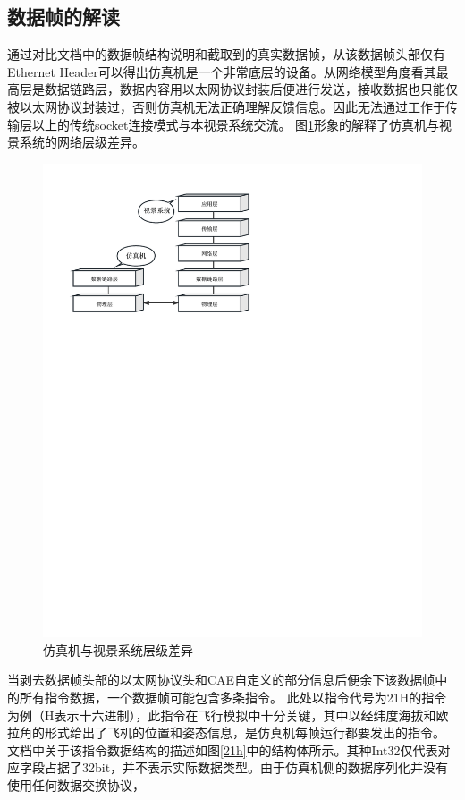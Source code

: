 \subsection{数据帧的解读}
通过对比文档中的数据帧结构说明和截取到的真实数据帧，从该数据帧头部仅有Ethernet Header可以得出仿真机是一个非常底层的设备。从网络模型角度看其最高层是数据链路层，数据内容用以太网协议封装后便进行发送，接收数据也只能仅被以太网协议封装过，否则仿真机无法正确理解反馈信息。因此无法通过工作于传输层以上的传统socket连接模式与本视景系统交流。
图\ref{netlayer}形象的解释了仿真机与视景系统的网络层级差异。
\begin{figure}[h]
    \begin{center}
        \includegraphics[width=.8\textwidth]{pictures/netlayer.pdf}
        \caption{仿真机与视景系统层级差异}
        \label{netlayer}
    \end{center}
\end{figure}
\par
当剥去数据帧头部的以太网协议头和CAE自定义的部分信息后便余下该数据帧中的所有指令数据，一个数据帧可能包含多条指令。
此处以指令代号为21H的指令为例（H表示十六进制），此指令在飞行模拟中十分关键，其中以经纬度海拔和欧拉角的形式给出了飞机的位置和姿态信息，是仿真机每帧运行都要发出的指令。
文档中关于该指令数据结构的描述如图\ref{21h}中的结构体所示。其种Int32仅代表对应字段占据了32bit，并不表示实际数据类型。由于仿真机侧的数据序列化并没有使用任何数据交换协议，
